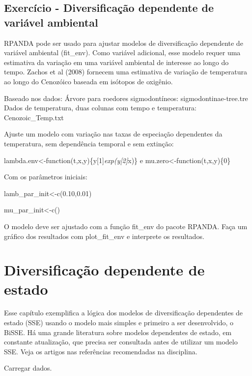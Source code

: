 \documentclass[
]{book}
\begin{document}
\section{Exercício - Diversificação dependente de variável ambiental}\label{exercuxedcio---diversificauxe7uxe3o-dependente-de-variuxe1vel-ambiental}

RPANDA pode ser usado para ajustar modelos de diversificação dependente de variável ambiental (fit\_env). Como variável adicional, esse modelo requer uma estimativa da variação em uma variável ambiental de interesse ao longo do tempo. Zachos et al (2008) fornecem uma estimativa de variação de temperatura ao longo do Cenozóico baseada em isótopos de oxigênio.

Baseado nos dados:
Árvore para roedores sigmodontíneos:
sigmodontinae-tree.tre
Dados de temperatura, duas colunas com tempo e
temperatura:
Cenozoic\_Temp.txt

Ajuste um modelo com variação nas taxas de especiação dependentes da
temperatura, sem dependência temporal e sem extinção:

lambda.env\textless-function(t,x,y)\{y{[}1{]}\emph{exp(y{[}2{]}}x)\}
e
mu.zero\textless-function(t,x,y)\{0\}

Com os parâmetros iniciais:

lamb\_par\_init\textless-c(0.10,0.01)

mu\_par\_init\textless-c()

O modelo deve ser ajustado com a função fit\_env do pacote RPANDA. Faça um gráfico dos resultados com plot\_fit\_env e interprete os resultados.

\chapter{Diversificação dependente de estado}\label{diversificauxe7uxe3o-dependente-de-estado}

Esse capítulo exemplifica a lógica dos modelos de diversificação dependentes de estado (SSE) usando o modelo mais simples e primeiro a ser desenvolvido, o BiSSE. Há uma grande literatura sobre modelos dependentes de estado, em constante atualização, que precisa ser consultada antes de utilizar um modelo SSE. Veja os artigos nas referências recomendadas na disciplina.

Carregar dados.
\end{document}
